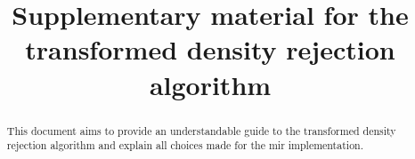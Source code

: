 \documentclass[]{article}
\title{Supplementary material for the transformed density rejection algorithm}
\author{}
\begin{document}
\maketitle

\begin{abstract}
This document aims to provide an understandable guide to the transformed density rejection algorithm and explain all choices made for the mir implementation.
\end{abstract}


%
%


\end{document}
